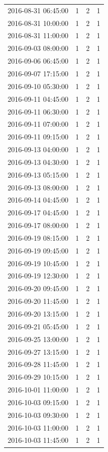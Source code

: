 \begin{tabular}{lrrr}
2016-08-31 06:45:00 & 1 & 2 & 1 \\
2016-08-31 10:00:00 & 1 & 2 & 1 \\
2016-08-31 11:00:00 & 1 & 2 & 1 \\
2016-09-03 08:00:00 & 1 & 2 & 1 \\
2016-09-06 06:45:00 & 1 & 2 & 1 \\
2016-09-07 17:15:00 & 1 & 2 & 1 \\
2016-09-10 05:30:00 & 1 & 2 & 1 \\
2016-09-11 04:45:00 & 1 & 2 & 1 \\
2016-09-11 06:30:00 & 1 & 2 & 1 \\
2016-09-11 07:00:00 & 1 & 2 & 1 \\
2016-09-11 09:15:00 & 1 & 2 & 1 \\
2016-09-13 04:00:00 & 1 & 2 & 1 \\
2016-09-13 04:30:00 & 1 & 2 & 1 \\
2016-09-13 05:15:00 & 1 & 2 & 1 \\
2016-09-13 08:00:00 & 1 & 2 & 1 \\
2016-09-14 04:45:00 & 1 & 2 & 1 \\
2016-09-17 04:45:00 & 1 & 2 & 1 \\
2016-09-17 08:00:00 & 1 & 2 & 1 \\
2016-09-19 08:15:00 & 1 & 2 & 1 \\
2016-09-19 09:45:00 & 1 & 2 & 1 \\
2016-09-19 10:45:00 & 1 & 2 & 1 \\
2016-09-19 12:30:00 & 1 & 2 & 1 \\
2016-09-20 09:45:00 & 1 & 2 & 1 \\
2016-09-20 11:45:00 & 1 & 2 & 1 \\
2016-09-20 13:15:00 & 1 & 2 & 1 \\
2016-09-21 05:45:00 & 1 & 2 & 1 \\
2016-09-25 13:00:00 & 1 & 2 & 1 \\
2016-09-27 13:15:00 & 1 & 2 & 1 \\
2016-09-28 11:45:00 & 1 & 2 & 1 \\
2016-09-29 10:15:00 & 1 & 2 & 1 \\
2016-10-01 11:00:00 & 1 & 2 & 1 \\
2016-10-03 09:15:00 & 1 & 2 & 1 \\
2016-10-03 09:30:00 & 1 & 2 & 1 \\
2016-10-03 11:00:00 & 1 & 2 & 1 \\
2016-10-03 11:45:00 & 1 & 2 & 1 \\

\end{tabular}
